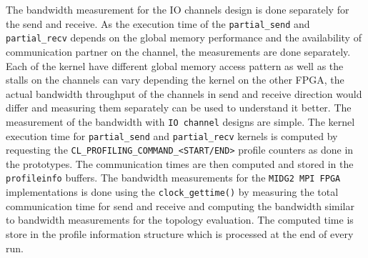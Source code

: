 









The bandwidth measurement for the IO channels design is done separately for the send and receive.
As the execution time of the \texttt{partial\_send} and \texttt{partial\_recv} depends on the
global memory performance and the availability of communication partner on the channel,
the measurements are done separately. Each of the kernel have different global memory access
pattern as well as the stalls on the channels can vary depending the kernel on the other FPGA,
the actual bandwidth throughput of the channels in send and receive direction would differ
and measuring them separately can be used to understand it better. The measurement
of the bandwidth with \texttt{IO channel} designs are simple. The kernel execution time
for \texttt{partial\_send} and \texttt{partial\_recv} kernels is computed by requesting
the \texttt{CL\_PROFILING\_COMMAND\_<START/END>} profile counters
as done in the prototypes. The communication times are then computed and stored
in the \texttt{profileinfo} buffers. The bandwidth measurements for the \texttt{MIDG2 MPI FPGA}
implementations is done using the \texttt{clock\_gettime()}
by measuring the total communication time for send and receive and computing the bandwidth similar to
bandwidth measurements for the topology evaluation. The computed time is store in the profile information structure
which is processed at the end of every run.

